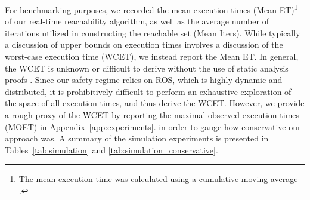 \documentclass[manuscript,screen,review]{acmart}
\begin{document}
For benchmarking purposes, we recorded the mean execution-times (Mean ET)\footnote{The mean execution time was calculated using a cumulative moving average \cite{Jin2019}.} of our real-time reachability algorithm, as well as the average number of iterations utilized in constructing the reachable set (Mean Iters). While typically a discussion of upper bounds on execution times involves a discussion of the worst-case execution time (WCET), we instead report the Mean ET. In general, the WCET is unknown or difficult to derive without the use of static analysis proofs \cite{Reinhard2008}. Since our safety regime relies on ROS, which is highly dynamic and distributed, it is prohibitively difficult to perform an exhaustive exploration of the space of all execution times, and thus derive the WCET.  However, we provide a rough proxy of the WCET by reporting the maximal observed execution times (MOET) \cite{Reinhard2008} in Appendix~\ref{app:experiments}. %
in order to gauge how conservative our approach was. A summary of the simulation experiments is presented in Tables~\ref{tab:simulation} and \ref{tab:simulation_conservative}.
\end{document}
